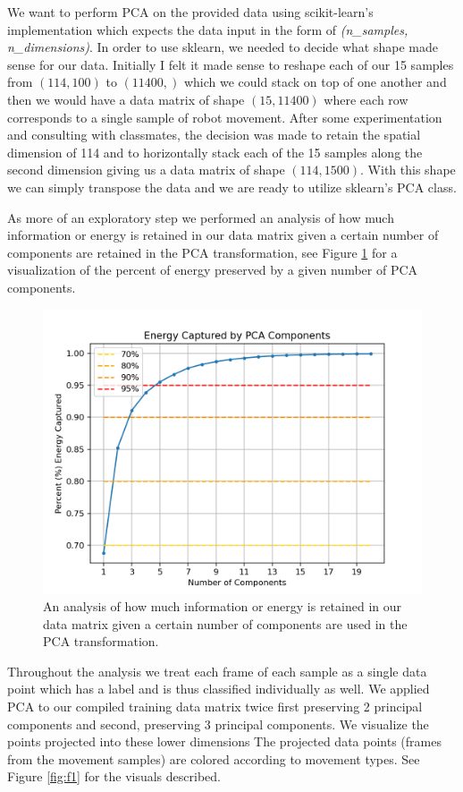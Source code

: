 \documentclass[11pt]{amsart}
\begin{document}
We want to perform PCA on the provided data using scikit-learn's implementation which expects the data input in the form of \textit{(n\_samples, n\_dimensions)}.
In order to use sklearn, we needed to decide what shape made sense for our data.
Initially I felt it made sense to reshape each of our 15 samples from $(114,100)$ to $(11400,)$ which we could stack on top of one another and then we would have a data matrix of shape $(15, 11400)$ where each row corresponds to a single sample of robot movement.
After some experimentation and consulting with classmates, the decision was made to retain the spatial dimension of 114 and to horizontally stack each of the 15 samples along the second dimension giving us a data matrix of shape $(114, 1500)$.
With this shape we can simply transpose the data and we are ready to utilize sklearn's PCA class.

As more of an exploratory step we performed an analysis of how much information or energy is retained in our data matrix given a certain number of components are retained in the PCA transformation, see Figure \ref{fig:f0} for a visualization of the percent of energy preserved by a given number of PCA components.

\begin{figure}[h]
	\centering
	\includegraphics[width=.5\textwidth]{../visualizations/energy_by_components.png}
 	\caption{An analysis of how much information or energy is retained in our data matrix given a certain number of components are used in the PCA transformation.}\label{fig:f0}
\end{figure}

Throughout the analysis we treat each frame of each sample as a single data point which has a label and is thus classified individually as well.
We applied PCA to our compiled training data matrix twice first preserving 2 principal components and second, preserving 3 principal components.
We visualize the points projected into these lower dimensions
The projected data points (frames from the movement samples) are colored according to movement types.
See Figure \ref{fig:f1} for the visuals described.
\end{document}
